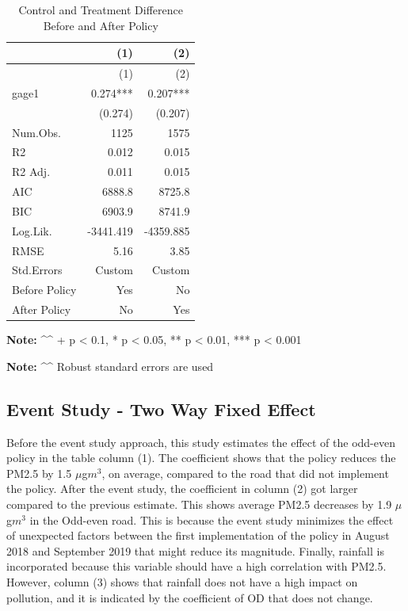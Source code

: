 \documentclass[AEJ]{AEA}
\begin{document}
{\small
\begin{longtable}[]{@{}lrr@{}}
\caption{Control and Treatment Difference Before and After
Policy}\tabularnewline
\toprule\noalign{}
& (1) & (2) \\
\midrule\noalign{}
\endfirsthead
\toprule\noalign{}
& (1) & (2) \\
\midrule\noalign{}
\endhead
\bottomrule\noalign{}
\endlastfoot
gage1 & 0.274*** & 0.207*** \\
& (0.274) & (0.207) \\
Num.Obs. & 1125 & 1575 \\
R2 & 0.012 & 0.015 \\
R2 Adj. & 0.011 & 0.015 \\
AIC & 6888.8 & 8725.8 \\
BIC & 6903.9 & 8741.9 \\
Log.Lik. & -3441.419 & -4359.885 \\
RMSE & 5.16 & 3.85 \\
Std.Errors & Custom & Custom \\
Before Policy & Yes & No \\
After Policy & No & Yes \\
\end{longtable}

\textbf{Note:} \^{}\^{} + p \textless{} 0.1, * p \textless{} 0.05, ** p
\textless{} 0.01, *** p \textless{} 0.001

\textbf{Note:} \^{}\^{} Robust standard errors are used}


\subsection{Event Study - Two Way Fixed
Effect}

Before the event study approach, this study estimates the effect of the
odd-even policy in the table column (1). The coefficient shows that the
policy reduces the PM2.5 by 1.5 $\mu$g$m^3$, on average, compared to
the road that did not implement the policy. After the event study, the coefficient in column (2) got larger compared to the
previous estimate. This shows average PM2.5 decreases by 1.9
$\mu$g$m^3$ in the Odd-even road. This is because the event study
minimizes the effect of unexpected factors between the first
implementation of the policy in August 2018 and September 2019 that
might reduce its magnitude. Finally, rainfall is
incorporated because this variable should have a high correlation with
PM2.5. However, column (3) shows that rainfall does not have a high
impact on pollution, and it is indicated by the coefficient of OD that
does not change.
\end{document}
